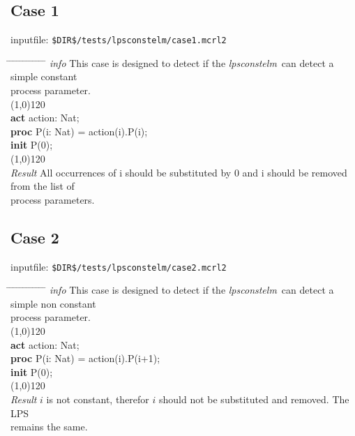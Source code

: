 \index{}\documentclass[a4paper,10pt]{article}
\theoremstyle{plain}
\theoremstyle{definition}
\newcommand{\tool}{\textit{lpsconstelm}}
\newcommand{\pp}{process parameter}
\newcommand{\pps}{process parameters}
\newcommand{\ti}{\textit}
\newcommand{\tb}{\textbf}
\newcommand{\tabw}{\hspace*{15.mm} \= \hspace*{20.mm} \= \hspace*{5.mm} \= \hspace*{5.mm} \= \hspace*{5.mm} \= \hspace*{5.mm}  \= \hspace*{5.mm}  \= \hspace*{5.mm}  \= \hspace*{5.mm} \= \hspace*{5.mm} \= \hspace*{5.mm}  \= \hspace*{5.mm}  \= \hspace*{5.mm}\kill}
\begin{document}
\subsection*{Case 1}
inputfile: \verb"$DIR$/tests/lpsconstelm/case1.mcrl2"
\begin{tabbing}
\tabw
\ti{info} \> This case is designed to detect if the \tool\ can detect a simple constant \\
\> \pp .\\
\line(1,0){120}\\

\tb{act}  \> action: Nat;\\
\tb{proc} \> P(i: Nat) \> = \> action(i).P(i);\\
\tb{init} \> P(0);\\

\line(1,0){120}\\
\ti{Result}
\> All occurrences of i should be substituted by 0 and i should be removed from the list of \\
\> \pps . \\
\end{tabbing}

\subsection*{Case 2}
inputfile: \verb"$DIR$/tests/lpsconstelm/case2.mcrl2"
\begin{tabbing}
\tabw
\ti{info}
\> This case is designed to detect if the \tool\ can detect a simple non constant \\
\> \pp .\\
\line(1,0){120}\\
\tb{act}  \> action: Nat;\\
\tb{proc} \> P(i: Nat) \> = \> action(i).P(i+1);\\
\tb{init} \> P(0);\\
\line(1,0){120}\\
\ti{Result} \> $i$ is not constant, therefor $i$ should not be substituted and removed. The LPS \\
\> remains the same. \\
\end{tabbing}
\end{document}
